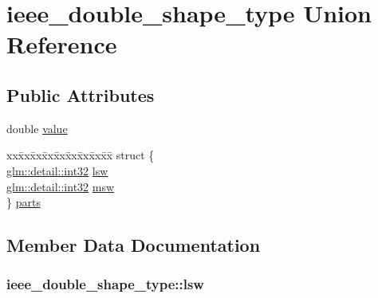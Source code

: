 \hypertarget{unionieee__double__shape__type}{}\section{ieee\+\_\+double\+\_\+shape\+\_\+type Union Reference}
\label{unionieee__double__shape__type}
\subsection*{Public Attributes}
\begin{DoxyCompactItemize}
\item 
double \hyperlink{unionieee__double__shape__type_a2d9c4cab9e3fa74e4be6d72f798a145b}{value}
\item 
\begin{tabbing}
xx\=xx\=xx\=xx\=xx\=xx\=xx\=xx\=xx\=\kill
struct \{\\
\>\hyperlink{stb__image_8c_a43d43196463bde49cb067f5c20ab8481}{glm::detail::int32} \hyperlink{unionieee__double__shape__type_a15dfdc2d74a323f6638204624834f101}{lsw}\\
\>\hyperlink{stb__image_8c_a43d43196463bde49cb067f5c20ab8481}{glm::detail::int32} \hyperlink{unionieee__double__shape__type_aea1156759f6afd58a56a7b4e7bfcee01}{msw}\\
\} \hyperlink{unionieee__double__shape__type_a5f0f0bc8771b433d849b7faf0e48bac6}{parts}\\

\end{tabbing}\end{DoxyCompactItemize}


\subsection{Member Data Documentation}
\hypertarget{unionieee__double__shape__type_a15dfdc2d74a323f6638204624834f101}{}
\subsubsection[{lsw}]{ ieee\+\_\+double\+\_\+shape\+\_\+type\+::lsw}\label{unionieee__double__shape__type_a15dfdc2d74a323f6638204624834f101}
\hypertarget{unionieee__double__shape__type_aea1156759f6afd58a56a7b4e7bfcee01}{}
